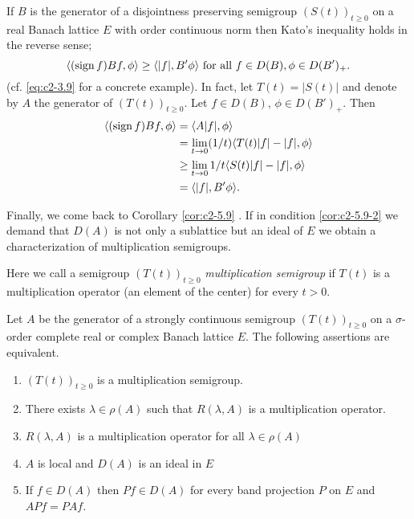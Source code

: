 \begin{remark}\label{rem:c2-5.12}
%
%
If $B$ is the generator of a disjointness preserving semigroup $(S(t))_{t \geq 0}$ on a real Banach lattice $E$ with order continuous norm then Kato's inequality holds in the reverse sense; \ie
\[
\langle(\operatorname{sign}  f)Bf,\phi \rangle \geq \langle |f|, B'\phi \rangle \text{ for all } f \in D(B), \phi \in D(B')_{+}.
\]
(cf. \eqref{eq:c2-3.9} for a concrete example). 
In fact, let $T(t) = |S(t)|$ and denote by $A$ the generator of $(T(t))_{t \geq 0}$. 
Let $f \in D(B)$, $\phi \in D(B')_{+}$.
Then 
\begin{align*}
\langle(\operatorname{sign}  f)Bf,\phi \rangle &= \langle A|f|,\phi \rangle \\
 &= \lim_{t \to 0} (1/t) \langle T(t)|f| - |f|, \phi \rangle \\
 &\geq \lim_{t \to 0} 1/t \langle S(t)|f| - |f|, \phi \rangle \\
 &= \langle |f|, B'\phi \rangle.
\end{align*}
\end{remark}

Finally, we come back to Corollary \ref{cor:c2-5.9}  .
If in condition \ref{cor:c2-5.9-2}   we demand that $D(A)$ is not only a sublattice but an ideal of $E$ we obtain a characterization of multiplication semigroups.

Here we call a semigroup $(T(t))_{t \geq 0}$ \emph{multiplication semigroup} if $T(t)$ is a multiplication operator (\ie an element of the center) for every $t > 0$.

\begin{theorem}\label{thm:c2-5.13}
%
%
%
Let $A$ be the generator of a strongly continuous semigroup $(T(t))_{t \geq 0}$ on a $\sigma$-order complete real or complex Banach lattice $E$.
The following assertions are equivalent.
\begin{enumerate}[\upshape (a)]
\item \label{thm:c2-5.13-1}
$(T(t))_{t \geq 0}$ is a multiplication semigroup.
\item \label{thm:c2-5.13-2}
There exists $\lambda \in \rho(A)$ such that $R(\lambda,A)$ is a multiplication operator.
\item \label{thm:c2-5.13-3}
$R(\lambda,A)$ is a multiplication operator for all $\lambda \in \rho(A)$
\item \label{thm:c2-5.13-4}
$A$ is local and $D(A)$ is an ideal in $E$
\item \label{thm:c2-5.13-5}
If $f \in D(A)$ then $Pf \in D(A)$ for every band projection $P$ on $E$ and $APf = PAf$.
\end{enumerate}
\end{theorem}

